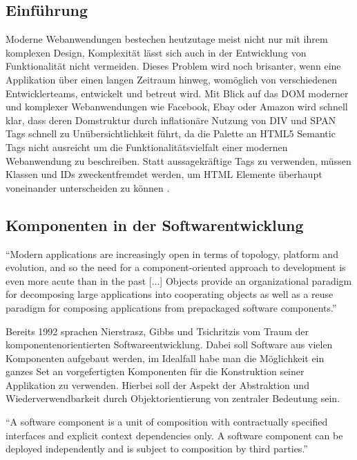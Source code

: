 \subsection{Einführung}

Moderne Webanwendungen bestechen heutzutage meist nicht nur mit ihrem komplexen Design, Komplexität lässt sich auch in der Entwicklung
von Funktionalität nicht vermeiden. Dieses Problem wird noch brisanter, wenn eine Applikation über einen langen Zeitraum hinweg,
womöglich von verschiedenen Entwicklerteams, entwickelt und betreut wird. Mit Blick auf das \ac{DOM} moderner und komplexer Webanwendungen wie Facebook, Ebay oder Amazon
wird schnell klar, dass deren Domstruktur durch inflationäre Nutzung von DIV und SPAN Tags schnell zu Unübersichtlichkeit führt,
da die Palette an HTML5 Semantic Tags nicht ausreicht um die Funktionalitätsvielfalt einer modernen Webanwendung zu beschreiben.
Statt aussagekräftige Tags zu verwenden, müssen Klassen und IDs zweckentfremdet werden, um HTML Elemente überhaupt voneinander unterscheiden zu können
\cite{sitepoint-introduction-to-webcomponents}.

\subsection{Komponenten in der Softwarentwicklung}

``Modern applications are increasingly
open in terms of topology,
platform and evolution, and so the
need for a component-oriented
approach to development is even
more acute than in the past [...]  Objects provide an organizational
paradigm for decomposing large
applications into cooperating objects
as well as a reuse paradigm for
composing applications from prepackaged
software components.''
\cite{nierstrasz1992component}

\vspace{0.5cm}

Bereits 1992 sprachen Nierstrasz, Gibbs und Tsichritzis vom Traum der komponentenorientierten Softwareentwicklung.
Dabei soll Software aus vielen Komponenten aufgebaut werden, im Idealfall habe man die Möglichkeit ein
ganzes Set an vorgefertigten Komponenten für die Konstruktion seiner Applikation zu verwenden.
Hierbei soll der Aspekt der Abstraktion und Wiederverwendbarkeit durch Objektorientierung von zentraler Bedeutung sein.

\vspace{0.5cm}
``A software component is a unit of composition with contractually specified interfaces and explicit
context dependencies only. A software component can be deployed independently and is subject to composition
by third parties.''
\cite{Szyperski}
\vspace{0.5cm}

